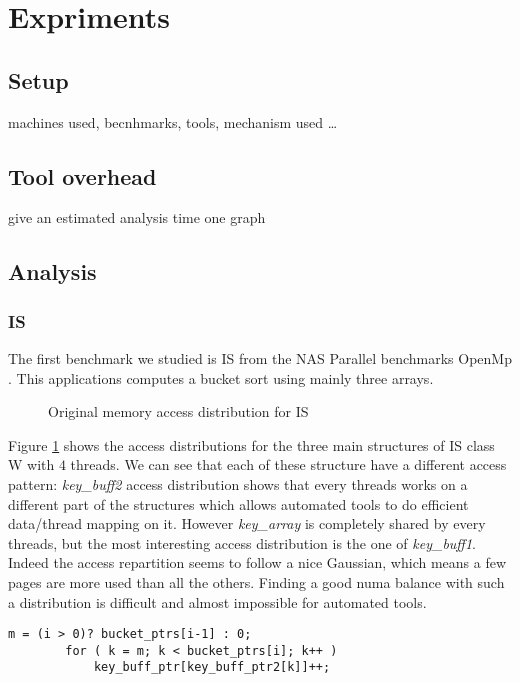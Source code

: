 \section{Expriments}
\label{sec:expe}
\subsection{Setup}
\label{sec:expe-setup}
machines used, becnhmarks, tools, mechanism used \ldots
\subsection{Tool overhead}
\label{sec:expe-overhead}
give an estimated analysis time one graph
\subsection{Analysis}
\label{sec:expe-analysis}
\subsubsection{IS}
The first benchmark we studied is IS from the  NAS Parallel benchmarks OpenMp
\cite{Feng04Unstructured}. This applications computes a bucket sort using
mainly three arrays.

\begin{figure}[htb]
    \centering
    \caption{Original memory access distribution for IS}
    \label{fig:is-behaviour-orig}
\end{figure}

Figure \ref{fig:is-behaviour-orig} shows the access distributions for the three
main structures of IS class W with $4$ threads. We can see that each of these
structure have a different access pattern: \emph{key\_buff2} access
distribution shows that every threads works on a different part of the
structures which allows automated tools to do efficient data/thread mapping on
it. However \emph{key\_array} is completely shared by every threads, but the
most interesting access distribution is the one of \emph{key\_buff1}. Indeed
the access repartition seems to follow a nice Gaussian, which means a few
pages are more used than all the others. Finding a good numa balance with such
a distribution is difficult and almost impossible for automated tools.

\begin{lstlisting}[frame=single, caption=IS code responsible for the
Guassain distribution of access, label=list:is]
        m = (i > 0)? bucket_ptrs[i-1] : 0;
        for ( k = m; k < bucket_ptrs[i]; k++ )
            key_buff_ptr[key_buff_ptr2[k]]++;  
\end{lstlisting}


